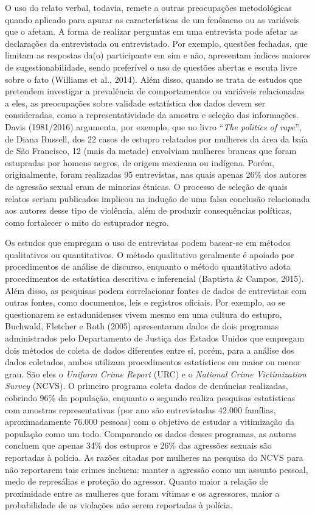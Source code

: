 O uso do relato verbal, todavia, remete a outras preocupações metodológicas quando aplicado para apurar as características de um fenômeno ou as variáveis que o afetam. A forma de realizar perguntas em uma entrevista pode afetar as declarações da entrevistada ou entrevistado. Por exemplo, questões fechadas, que limitam as respostas da(o) participante em sim e não, apresentam índices maiores de sugestionabilidade, sendo preferível o uso de questões abertas e escuta livre sobre o fato (Williams et al., 2014). Além disso, quando se trata de estudos que pretendem investigar a prevalência de comportamentos ou variáveis relacionadas a eles, as preocupações sobre validade estatística dos dados devem ser consideradas, como a representatividade da amostra e seleção das informações. Davis (1981/2016) argumenta, por exemplo, que no livro ``\textit{The politics of rape}'', de Diana Russell, dos 22 casos de estupro relatados por mulheres da área da baía de São Francisco, 12 (mais da metade) envolviam mulheres brancas que foram estupradas por homens negros, de origem mexicana ou indígena. Porém, originalmente, foram realizadas 95 entrevistas, nas quais apenas 26\% dos autores de agressão sexual eram de minorias étnicas. O processo de seleção de quais relatos seriam publicados implicou na indução de uma falsa conclusão relacionada aos autores desse tipo de violência, além de produzir consequências políticas, como fortalecer o mito do estuprador negro.

Os estudos que empregam o uso de entrevistas podem basear-se em métodos qualitativos ou quantitativos. O método qualitativo geralmente é apoiado por procedimentos de análise de discurso, enquanto o método quantitativo adota procedimentos de estatística descritiva e inferencial (Baptista \& Campos, 2015). Além disso, as pesquisas podem correlacionar fontes de dados de entrevistas com outras fontes, como documentos, leis e registros oficiais. Por exemplo, ao se questionarem se estadunidenses vivem mesmo em uma cultura do estupro, Buchwald, Fletcher e Roth (2005) apresentaram dados de dois programas administrados pelo Departamento de Justiça dos Estados Unidos que empregam dois métodos de coleta de dados diferentes entre si, porém, para a análise dos dados coletados, ambos utilizam procedimentos estatísticos em maior ou menor grau. São eles o \textit{Uniform Crime Report} (URC) e o \textit{National Crime Victimization Survey} (NCVS). O primeiro programa coleta dados de denúncias realizadas, cobrindo 96\% da população, enquanto o segundo realiza pesquisas estatísticas com amostras representativas (por ano são entrevistadas 42.000 famílias, aproximadamente 76.000 pessoas) com o objetivo de estudar a vitimização da população como um todo. Comparando os dados desses programas, as autoras concluem que apenas 34\% dos estupros e 26\% das agressões sexuais são reportadas à polícia. As razões citadas por mulheres na pesquisa do NCVS para não reportarem tais crimes incluem: manter a agressão como um assunto pessoal, medo de represálias e proteção do agressor. Quanto maior a relação de proximidade entre as mulheres que foram vítimas e os agressores, maior a probabilidade de as violações não serem reportadas à polícia. 

